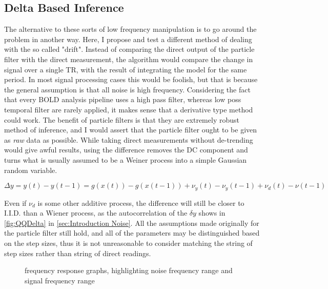 \subsection{Delta Based Inference}
\label{sec:Methods Delta Based Inference}
The alternative to these sorts of low frequency manipulation is to
go around the problem in another way. Here, I propose and test a 
different method of dealing with the so called "drift". 
Instead of comparing the direct output of the particle filter with the direct
measurement, the algorithm would compare the change in signal over a single TR,
with the result of integrating the model for the same period. 
In most signal processing cases this would be foolish, but that is because the 
general assumption is that all noise is high frequency. Considering 
the fact that every BOLD analysis pipeline uses a high pass filter,
whereas low poss temporal filter are rarely applied, it makes sense
that a derivative type method could work. The benefit of particle filters
is that they are extremely robust method of inference, and I would assert 
that the particle filter ought to be given as \emph{raw} data as possible. 
While taking direct measurements
without de-trending would give awful results, using the difference removes the 
DC component and turns what is usually assumed to be a Weiner process into 
a simple Gaussian random variable. 

\begin{equation}
\Delta y = y(t) - y(t-1) = g(x(t)) - g(x(t-1)) + \nu_y(t) - \nu_y(t-1) + \nu_d(t) - \nu(t-1)
\label{eq:measass_delta}
\end{equation}

Even if $\nu_d$ is some other additive process, the difference will still be closer
to I.I.D. than a Wiener process, as the autocorrelation of the $\delta y$ shows
in \autoref{fig:QQDelta} in \autoref{sec:Introduction Noise}. 
 All the assumptions made originally
for the particle filter still hold, and all of the parameters may be distinguished based on
the step sizes, thus it is not unreasonable to consider matching the string of step sizes
rather than string of direct readings. 

\begin{figure}
\label{fig:FrequencyGraphs}
\caption{frequency response graphs, highlighting noise frequency range and signal frequency range}
\end{figure}

